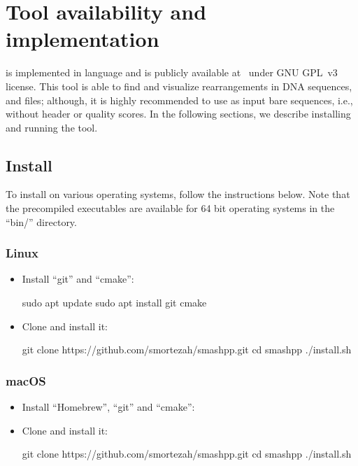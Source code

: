 \documentclass[a4paper,9pt]{extarticle}
\begin{document}
\clearpage
\section{Tool availability and implementation}
\label{sec.tool}
\smashpp is implemented in \cpp language and is publicly available at~\cite{web-smashpp} under GNU GPL~v3 license. This tool is able to find and visualize rearrangements in DNA sequences, \fasta and \fastq files; although, it is highly recommended to use as input bare sequences, i.e., without header or quality scores. In the following sections, we describe installing and running the \smashpp tool.

\subsection{Install}
To install \smashpp on various operating systems, follow the instructions below. Note that the precompiled executables are available for 64 bit operating systems in the ``bin/'' directory.


\subsubsection*{Linux}
\begin{itemize}
  \item Install ``git'' and ``cmake'':
\begin{code}[style=bash]
sudo apt update
sudo apt install git cmake
\end{code}
\item Clone \smashpp and install it:
\begin{code}[style=bash]
git clone https://github.com/smortezah/smashpp.git
cd smashpp
./install.sh
\end{code}
\end{itemize}

\subsubsection*{macOS}
\begin{itemize}
    \item Install ``Homebrew'', ``git'' and ``cmake'':
\item Clone \smashpp and install it:
\begin{code}[style=bash]
git clone https://github.com/smortezah/smashpp.git
cd smashpp
./install.sh
\end{code}
\end{itemize}
\end{document}
